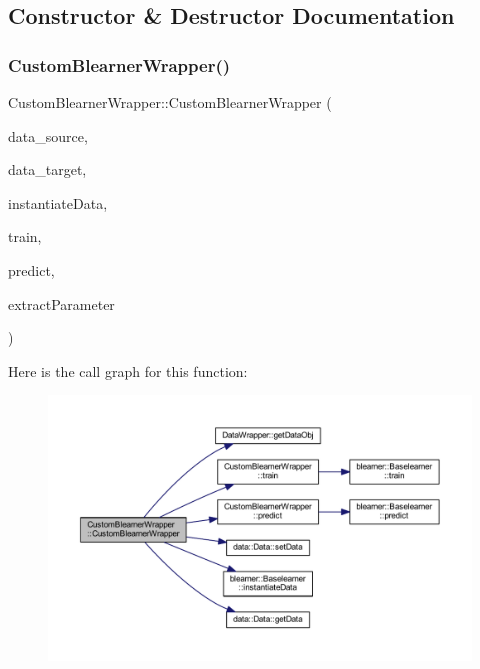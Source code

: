 \subsection{Constructor \& Destructor Documentation}
\mbox{\label{class_custom_blearner_wrapper_a2fd4bb5e6f0c8fb5cae69ef46a5e2db8}} 
\subsubsection{\texorpdfstring{Custom\+Blearner\+Wrapper()}{CustomBlearnerWrapper()}}
{\footnotesize\ttfamily Custom\+Blearner\+Wrapper\+::\+Custom\+Blearner\+Wrapper (\begin{DoxyParamCaption}\item[{\mbox{\hyperlink{class_data_wrapper}{Data\+Wrapper}} \&}]{data\+\_\+source,  }\item[{\mbox{\hyperlink{class_data_wrapper}{Data\+Wrapper}} \&}]{data\+\_\+target,  }\item[{Rcpp\+::\+Function}]{instantiate\+Data,  }\item[{Rcpp\+::\+Function}]{train,  }\item[{Rcpp\+::\+Function}]{predict,  }\item[{Rcpp\+::\+Function}]{extract\+Parameter }\end{DoxyParamCaption})\hspace{0.3cm}{\ttfamily [inline]}}

Here is the call graph for this function\+:
\nopagebreak
\begin{figure}[H]
\begin{center}
\leavevmode
\includegraphics[width=350pt]{class_custom_blearner_wrapper_a2fd4bb5e6f0c8fb5cae69ef46a5e2db8_cgraph}
\end{center}
\end{figure}


